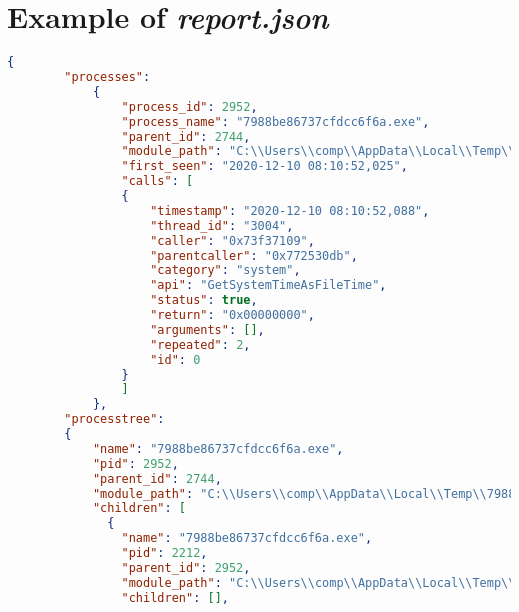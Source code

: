 \chapter{Example of \emph{report.json}} \label{app:report_example}

\begin{lstlisting}[language=json, caption={Example of \emph{behavior} part entries in \emph{report.json} - only examples of entries},captionpos=b, label={lst:report_example}]
    {
        "processes":
            {
                "process_id": 2952,
                "process_name": "7988be86737cfdcc6f6a.exe",
                "parent_id": 2744,
                "module_path": "C:\\Users\\comp\\AppData\\Local\\Temp\\7988be86737cfdcc6f6a.exe",
                "first_seen": "2020-12-10 08:10:52,025",
                "calls": [
                {
                    "timestamp": "2020-12-10 08:10:52,088",
                    "thread_id": "3004",
                    "caller": "0x73f37109",
                    "parentcaller": "0x772530db",
                    "category": "system",
                    "api": "GetSystemTimeAsFileTime",
                    "status": true,
                    "return": "0x00000000",
                    "arguments": [],
                    "repeated": 2,
                    "id": 0
                }
                ]
            },
        "processtree":
        {
            "name": "7988be86737cfdcc6f6a.exe",
            "pid": 2952,
            "parent_id": 2744,
            "module_path": "C:\\Users\\comp\\AppData\\Local\\Temp\\7988be86737cfdcc6f6a.exe",
            "children": [
              {
                "name": "7988be86737cfdcc6f6a.exe",
                "pid": 2212,
                "parent_id": 2952,
                "module_path": "C:\\Users\\comp\\AppData\\Local\\Temp\\7988be86737cfdcc6f6a.exe",
                "children": [],

\end{lstlisting}
